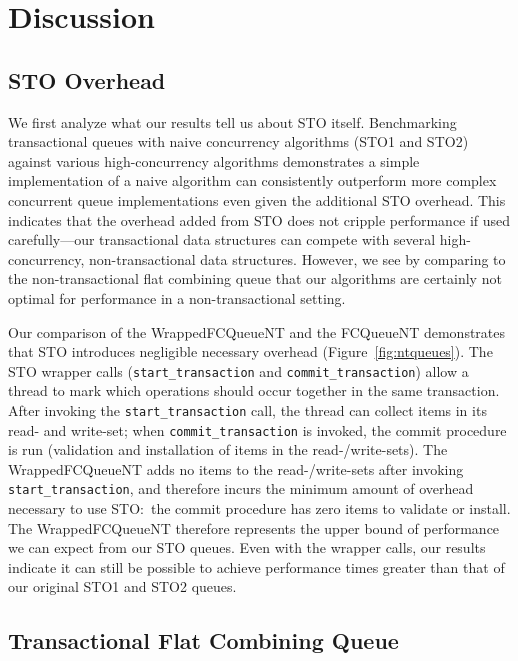 \section{Discussion}

\subsection{STO Overhead}
We first analyze what our results tell us about STO itself. Benchmarking transactional queues with naive concurrency algorithms (STO1 and STO2) against various high-concurrency algorithms demonstrates a simple implementation of a naive algorithm can consistently outperform more complex concurrent queue implementations even given the additional STO overhead. This indicates that the overhead added from STO does not cripple performance if used carefully---our transactional data structures can compete with several high-concurrency, non-transactional data structures. However, we see by comparing to the non-transactional flat combining queue that our algorithms are certainly not optimal for performance in a non-transactional setting.

Our comparison of the WrappedFCQueueNT and the FCQueueNT demonstrates that STO introduces negligible necessary overhead (Figure~\ref{fig:ntqueues}). The STO wrapper calls (\texttt{start\_transaction} and \texttt{commit\_transaction}) allow a thread to mark which operations should occur together in the same transaction. After invoking the \texttt{start\_transaction} call, the thread can collect items in its read- and write-set; when \texttt{commit\_transaction} is invoked, the commit procedure is run (validation and installation of items in the read-/write-sets). The WrappedFCQueueNT adds no items to the read-/write-sets after invoking \texttt{start\_transaction}, and therefore incurs the minimum amount of overhead necessary to use STO:\ the commit procedure has zero items to validate or install. The WrappedFCQueueNT therefore represents the upper bound of performance we can expect from our STO queues. Even with the wrapper calls, our results indicate it can still be possible to achieve performance  times greater than that of our original STO1 and STO2 queues.

\subsection{Transactional Flat Combining Queue}

